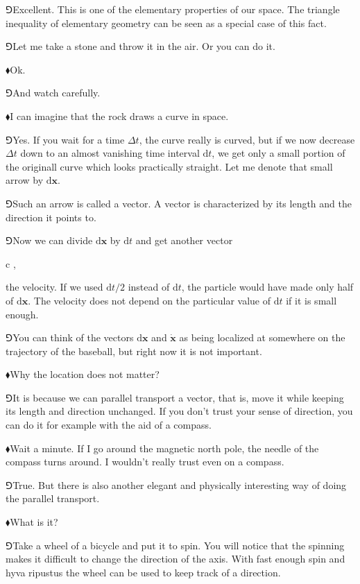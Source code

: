 \documentclass[11pt,oneside%
]{memoir}
\newenvironment{eqna}{\begin{IEEEeqnarray*}{c}}{\end{IEEEeqnarray*}\ignorespacesafterend}
\newcommand{\der}[2]{\frac{\dd#1}{\dd#2}}
\newcommand{\dd}{\mathrm{d}}
\renewcommand{\vec}[1]{\mathbf{#1}}
\newcommand{\dvec}[1]{\dot{\vec{#1}}}
\newcommand{\hea}{\(\blacklozenge\)\;}
\newcommand{\heb}{\(\Game\)\;}
\begin{document}
\heb Excellent. This is one of the elementary properties of our space. The triangle inequality of elementary geometry can be seen as a special case of this fact.

\heb Let me take a stone and throw it in the air. Or you can do it.

\hea Ok.

\heb And watch carefully.


\hea I can imagine that the rock draws a curve in space.

\heb Yes. If you wait for a time \(\Delta t\), the curve really is curved, but if we now decrease \(\Delta t\) down to an almost vanishing time interval \(\dd t\), we get only a small portion of the originall curve which looks practically straight. Let me denote that small arrow by \(\dd\vec{x}\).

\heb Such an arrow is called a vector. A vector is characterized by its length and the direction it points to.

\heb Now we can divide \(\dd\vec{x}\) by \(\dd t\) and get another vector
\begin{eqna}
    \der{\vec{x}}{t}\doteq\dvec{x},
\end{eqna}
the velocity. If we used \(\dd t/2\) instead of \(\dd t\), the particle would have made only half of \(\dd\vec{x}\). The velocity does not depend on the particular value of \(\dd t\) if it is small enough.

\heb You can think of the vectors \(\dd\vec{x}\) and \(\dvec{x}\) as being localized at somewhere on the trajectory of the baseball, but right now it is not important.

\hea Why the location does not matter?

\heb It is because we can parallel transport a vector, that is, move it while keeping its length and direction unchanged. If you don't trust your sense of direction, you can do it for example with the aid of a compass.

\hea Wait a minute. If I go around the magnetic north pole, the needle of the compass turns around. I wouldn't really trust even on a compass.

\heb True. But there is also another elegant and physically interesting way of doing the parallel transport.

\hea What is it?

\heb Take a wheel of a bicycle and put it to spin. You will notice that the spinning makes it difficult to change the direction of the axis. With fast enough spin and hyva ripustus the wheel can be used to keep track of a direction.
\end{document}
